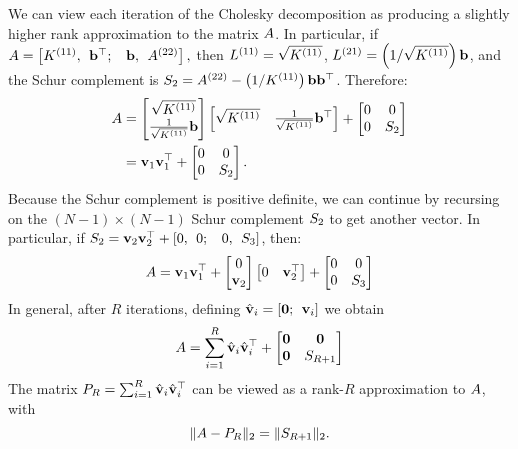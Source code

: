 We can view each iteration of the Cholesky decomposition as producing a slightly higher rank approximation to the matrix $A$.
In particular, if  $ A = \left[ K^{(11)}, \:\: \mathbf{b}^{\top}; \:\:\:\: \mathbf{b}, \:\: A^{(22)} \right], $
then $L^{(11)} = \sqrt{K^{(11)}}$, $L^{(21)} = \left( 1 / \sqrt{K^{(11)}} \right) \mathbf{b}$, and the Schur complement is $S_2 = A^{(22)} - \left(1/ K^{(11)} \right) \mathbf{b} \mathbf{b}^{\top}$.
Therefore:
%
\begin{align}
  A &=
    \begin{bmatrix} \sqrt{ K^{(11)} } \\ \frac{1}{\sqrt{K^{(11)}}} \mathbf{b} \end{bmatrix}
    \begin{bmatrix} \sqrt{ K^{(11)} } & \frac{1}{\sqrt{K^{(11)}}} \mathbf{b}^\top \end{bmatrix}
    +
    \begin{bmatrix} 0 & 0 \\ 0 & S_2 \end{bmatrix}
  \nonumber \\
  &= \mathbf{v}_{1}\mathbf{v}_{1}^{\top} + \begin{bmatrix} 0 & 0 \\ 0 & S_2 \end{bmatrix}
  \label{eq:chol_incomplete}.
\end{align}
%
Because the Schur complement is positive definite, we can continue by recursing on the $(N-1) \times (N - 1)$ Schur complement $S_2$ to get another vector.
In particular, if $S_2 = \mathbf{v}_{2}\mathbf{v}_{2}^{\top} + \left[0, \:\: 0; \:\:\:\: 0, \:\: S_3 \right]$, then:
%
\begin{align}
  A  = \mathbf{v}_{1}\mathbf{v}_{1}^{\top} + \begin{bmatrix} 0 \\ \mathbf{v}_{2} \end{bmatrix} \begin{bmatrix} 0 & \mathbf{v}_2^\top \end{bmatrix} +
  \begin{bmatrix} 0 & 0 \\ 0 & S_3 \end{bmatrix}
\end{align}
%
In general, after $R$ iterations, defining $\hat{\mathbf{v}}_{i} = \left[ \mathbf{0}; \:\: \mathbf{v}_i \right]$ we obtain
%
\begin{align}
  A  = \sum_{i=1}^{R} \hat{\mathbf{v}}_{i} \hat{\mathbf{v}}_{i}^{\top} + \begin{bmatrix} \mathbf{0} & \mathbf{0} \\ \mathbf{0} & S_{R+1} \end{bmatrix}
\end{align}
%
The matrix $P_{R} = \sum_{i=1}^{R}\hat{\mathbf{v}}_{i}\hat{\mathbf{v}}_{i}^{\top}$ can be viewed as a rank-$R$ approximation to $A$, with
$$
  \Vert A - P_{R} \Vert_{2} = \Vert S_{R+1} \Vert_2.
$$

